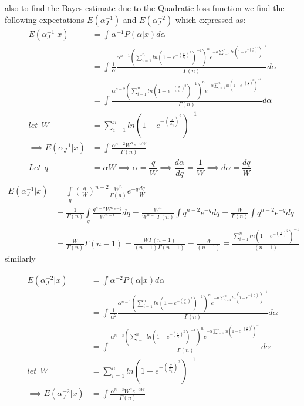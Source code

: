 \documentclass[a4paper,12pt]{report}
\begin{document}
\noindent also to find the Bayes estimate due to the Quadratic loss function we find the following expectations $E(\alpha_J^{-1})$ and $E(\alpha_J^{-2})$ which expressed as:\\
\[\begin{split}
E(\alpha_J^{-1}|x)&=\int \alpha^{-1}P(\alpha|x)d\alpha\\
&=\int \frac{1}{\alpha}\frac{\alpha^{n-1}\left(\sum\limits_{ i=1 }^{n}ln\left(1-e^{-\left(\frac{\sigma}{x_i}\right)^2}\right)^{-1}\right)^n e^{-\alpha\sum\limits_{ i=1 }^{n}ln\left(1-e^{-\left(\frac{\sigma}{x_i}\right)^2}\right)^{-1}}}{\Gamma(n)}d\alpha\\
&=\int \frac{\alpha^{n-2}\left(\sum\limits_{ i=1 }^{n}ln\left(1-e^{-\left(\frac{\sigma}{x_i}\right)^2}\right)^{-1}\right)^n e^{-\alpha\sum\limits_{ i=1 }^{n}ln\left(1-e^{-\left(\frac{\sigma}{x_i}\right)^2}\right)^{-1}}}{\Gamma(n)}d\alpha\\
let \ \ W &=\sum\limits_{ i=1 }^{n}ln\left(1-e^{-\left(\frac{\sigma}{x_i}\right)^2}\right)^{-1}\\
\implies E(\alpha_J^{-1}|x) &= \int \frac{\alpha^{n-2}W^ne^{-\alpha W}}{\Gamma(n)}\\
Let\ \ q&=\alpha W\implies\alpha=\dfrac{q}{W}\implies\dfrac{d\alpha}{dq}=\dfrac{1}{W}\implies d\alpha=\dfrac{dq}{W}\\
\end{split}\]
\begin{equation}\label{3.31a}
\begin{split}
E(\alpha_J^{-1}|x)&=\int\limits_{q}\left(\frac{q}{W}\right)^{n-2}\frac{W^n}{\Gamma(n)}e^{-q}\frac{dq}{W}\\
&=\frac{1}{\Gamma(n)}\int\limits_{q}\frac{q^{n-2}W^ne^{-q}}{W^{n-1}}dq=\frac{W^n}{W^{n-1}\Gamma(n)}\int q^{n-2}e^{-q}dq=\frac{W}{\Gamma(n)}\int q^{n-2}e^{-q}dq\\
&=\frac{W}{\Gamma(n)}\Gamma(n-1)= \frac{W \Gamma(n-1)}{(n-1)\Gamma(n-1)}=\frac{W }{(n-1)}\equiv\frac{\sum\limits_{ i=1 }^{n}ln\left(1-e^{-\left(\frac{\sigma}{x_i}\right)^2}\right)^{-1}}{(n-1)}
\end{split}
\end{equation}
similarly

\[\begin{split}
E(\alpha_J^{-2}|x)&=\int \alpha^{-2}P(\alpha|x)d\alpha\\
&=\int \frac{1}{\alpha^2}\frac{\alpha^{n-1}\left(\sum\limits_{ i=1 }^{n}ln\left(1-e^{-\left(\frac{\sigma}{x_i}\right)^2}\right)^{-1}\right)^n e^{-\alpha\sum\limits_{ i=1 }^{n}ln\left(1-e^{-\left(\frac{\sigma}{x_i}\right)^2}\right)^{-1}}}{\Gamma(n)}d\alpha\\
&=\int \frac{\alpha^{n-3}\left(\sum\limits_{ i=1 }^{n}ln\left(1-e^{-\left(\frac{\sigma}{x_i}\right)^2}\right)^{-1}\right)^n e^{-\alpha\sum\limits_{ i=1 }^{n}ln\left(1-e^{-\left(\frac{\sigma}{x_i}\right)^2}\right)^{-1}}}{\Gamma(n)}d\alpha\\
let \ \ W &=\sum\limits_{ i=1 }^{n}ln\left(1-e^{-\left(\frac{\sigma}{x_i}\right)^2}\right)^{-1}\\
\implies E(\alpha_J^{-2}|x) &= \int \frac{\alpha^{n-3}W^ne^{-\alpha W}}{\Gamma(n)}\\
\end{split}\]
\end{document}
